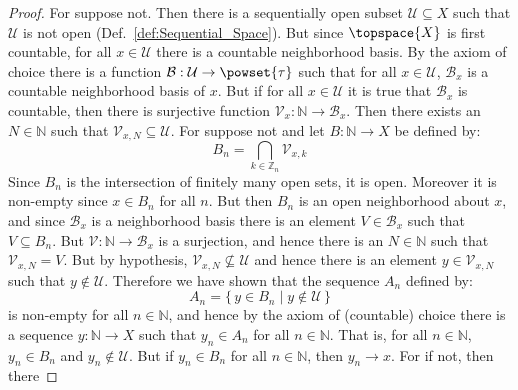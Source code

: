         \begin{proof}
            For suppose not. Then there is a sequentially open subset
            $\mathcal{U}\subseteq{X}$ such that $\mathcal{U}$ is not open
            (Def.~\ref{def:Sequential_Space}). But since $\topspace{X}$ is first
            countable, for all $x\in\mathcal{U}$ there is a countable
            neighborhood basis. By the axiom of choice there is a
            function $\mathcal{B}:\mathcal{U}\rightarrow\powset{\tau}$ such that
            for all $x\in\mathcal{U}$, $\mathcal{B}_{x}$ is a countable
            neighborhood basis of $x$. But if for all $x\in\mathcal{U}$ it is
            true that $\mathcal{B}_{x}$ is countable, then there is surjective
            function $\mathcal{V}_{x}:\mathbb{N}\rightarrow\mathcal{B}_{x}$.
            Then there exists an $N\in\mathbb{N}$ such that
            $\mathcal{V}_{x,N}\subseteq\mathcal{U}$. For suppose not and let
            $B:\mathbb{N}\rightarrow{X}$ be defined by:
            \begin{equation}
                B_{n}=\bigcap_{k\in\mathbb{Z}_{n}}\mathcal{V}_{x,k}
            \end{equation}
            Since $B_{n}$ is the intersection of finitely many open sets, it is
            open. Moreover it is non-empty since $x\in{B}_{n}$ for all $n$.
            But then $B_{n}$ is an open neighborhood about $x$, and since
            $\mathcal{B}_{x}$ is a neighborhood basis there is an element
            $V\in\mathcal{B}_{x}$ such that $V\subseteq{B}_{n}$. But
            $\mathcal{V}:\mathbb{N}\rightarrow\mathcal{B}_{x}$ is a surjection,
            and hence there is an $N\in\mathbb{N}$ such that
            $\mathcal{V}_{x,N}=V$. But by hypothesis,
            $\mathcal{V}_{x,N}\nsubseteq\mathcal{U}$ and hence there is an
            element $y\in\mathcal{V}_{x,N}$ such that $y\notin\mathcal{U}$.
            Therefore we have shown that the sequence $A_{n}$ defined by:
            \begin{equation}
                A_{n}=\{\,y\in{B}_{n}\;|\;y\not\in\mathcal{U}\,\}
            \end{equation}
            is non-empty for all $n\in\mathbb{N}$, and hence by the axiom of
            (countable) choice there is a sequence $y:\mathbb{N}\rightarrow{X}$
            such that $y_{n}\in{A}_{n}$ for all $n\in\mathbb{N}$. That is,
            for all $n\in\mathbb{N}$, $y_{n}\in{B}_{n}$ and
            $y_{n}\notin\mathcal{U}$. But if $y_{n}\in{B}_{n}$ for all
            $n\in\mathbb{N}$, then $y_{n}\rightarrow{x}$. For if not, then there

\end{proof}
